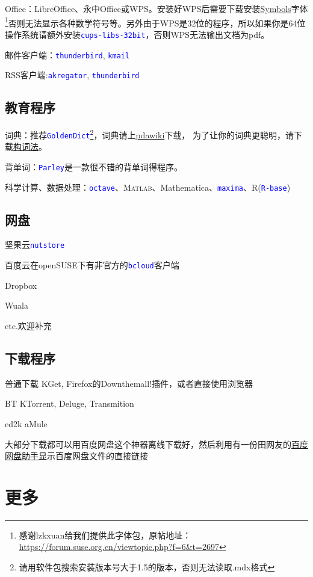 \documentclass[10pt,openany]{book}
\newcommand{\soft}[1]{\texttt{\textcolor{blue}{#1}}}
\begin{document}
Office：LibreOffice、永中Office或WPS。安装好WPS后需要下载安装\href{http://pan.baidu.com/s/1mgC3A0C}{Symbols}字体\footnote{感谢lzkxuan给我们提供此字体包，原帖地址：\url{https://forum.suse.org.cn/viewtopic.php?f=6&t=2697}}否则无法显示各种数学符号等。另外由于WPS是32位的程序，所以如果你是64位操作系统请额外安装\soft{cups-libs-32bit}，否则WPS无法输出文档为pdf。

邮件客户端：\soft{thunderbird}, \soft{kmail}

RSS客户端:\soft{akregator}, \soft{thunderbird}
\section{教育程序}
词典：推荐\soft{GoldenDict}\footnote{请用软件包搜索安装版本号大于1.5的版本，否则无法读取.mdx格式}，词典请上\href{http://pdawiki.com/forum/forum.php}{pdawiki}下载，
为了让你的词典更聪明，请下载\href{https://zpj.blog.ustc.edu.cn/wp-content/uploads/2014/02/wordsrule.tar.gz}{构词法}。

背单词：\soft{Parley}是一款很不错的背单词得程序。

科学计算、数据处理：\soft{octave}、\textsc{Matlab}、Mathematica、\soft{maxima}、R(\soft{R-base})
\section{网盘}
\begin{compactitem}
 \item 坚果云\soft{nutstore}
 \item 百度云在openSUSE下有非官方的\soft{bcloud}客户端
 \item Dropbox
 \item Wuala
 \item etc.欢迎补充
\end{compactitem}
\section{下载程序}
\begin{compactdesc}
 \item[普通下载] KGet, Firefox的Down\-them\-all!插件，或者直接使用浏览器
 \item[BT] KTorrent, Deluge, Transmition
 \item[ed2k] aMule
\end{compactdesc}

大部分下载都可以用百度网盘这个神器离线下载好，然后利用有一份田网友的\href{http://git.oschina.net/youyifentian/dupanlink}{百度网盘助手}显示百度网盘文件的直接链接
\chapter{更多}
\end{document}
